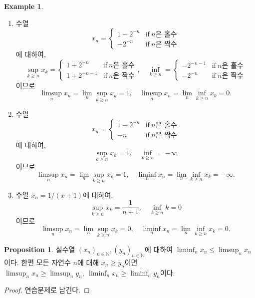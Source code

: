 \documentclass[11pt]{book}
\numberwithin{equation}{chapter}
\def\NN{\mathbb{N}}
\def\textif{\text{if}}
\theoremstyle{definition}
\newtheorem{prop}[thm]{Proposition}
\newtheorem*{ex}{Example}
\begin{document}
\begin{ex}
    \quad

    \begin{enumerate} [label=(\alph*), leftmargin=2\parindent]
        \item 수열
        \[
        x_n = \begin{cases}
            1 + 2^{-n} &\textif \ n\text{은 홀수}\\
            -2^{-n}  &\textif \ n\text{은 짝수}
        \end{cases}
        \]
        에 대하여,
        \[
        \sup_{k \ge n} x_k =
            \begin{cases}
                1 + 2^{-n} &\textif \ n\text{은 홀수}\\
                1 + 2^{-n-1} &\textif \ n\text{은 짝수}
            \end{cases}
        , \quad \inf_{k \ge n} =
            \begin{cases}
                -2^{-n-1} &\textif \ n\text{은 홀수}\\
                -2^{-n} &\textif \ n\text{은 짝수}
            \end{cases}
        \]
        이므로
        \[
            \limsup_{n} x_n = \lim_n \sup_{k \ge n} x_k = 1, \quad \limsup_{n} x_n = \lim_n \inf_{k \ge n} x_k = 0.
        \]
        \item 수열
        \[
            x_n = \begin{cases}
                1 - 2^{-n} &\textif \ n\text{은 홀수}\\
                -n  &\textif \ n\text{은 짝수}
            \end{cases}
        \]
        에 대하여,
        \[
        \sup_{k \ge n} x_k = 1
        , \quad \inf_{k \ge n} = -\infty
        \]
        이므로
        \[
            \limsup_{n} x_n = \lim_n \sup_{k \ge n} x_k = 1, \quad \liminf_{n} x_n = \lim_n \inf_{k \ge n} x_k = -\infty.
        \]
        \item 수열 \(x_n = 1/(x+1)\)에 대하여,
        \[
            \sup_{k \ge n} x_k = \frac{1}{n+1}, \quad \inf_{k \ge n} k = 0
        \]
        이므로
        \[
            \limsup_{n} x_n = \lim_n \sup_{k \ge n} x_k = 0, \quad \liminf_{n} x_n = \lim_n \inf_{k \ge n} x_k = 0.
        \]
    \end{enumerate}
\end{ex}

    \begin{prop}
        실수열 \((x_n)_{n \in \NN},  (y_n)_{n \in \NN}\)에 대하여 \(\liminf_n x_n \le \limsup_n x_n\)이다. 한편 모든 자연수 \(n\)에 대해 \(x_n \ge y_n\)이면 \(\limsup_n x_n \ge \limsup_n y_n, \ \liminf_n x_n \ge \liminf_n y_n\)이다.
    \end{prop}
    \begin{proof}
        연습문제로 남긴다.
    \end{proof}
\end{document}
